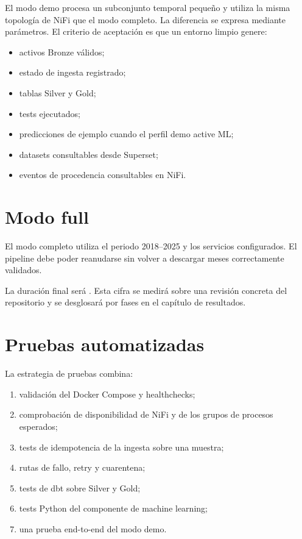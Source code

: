 El modo demo procesa un subconjunto temporal pequeño y utiliza la misma topología de NiFi que el modo completo. La diferencia se expresa mediante parámetros. El criterio de aceptación es que un entorno limpio genere:

\begin{itemize}
\item activos Bronze válidos;
\item estado de ingesta registrado;
\item tablas Silver y Gold;
\item tests ejecutados;
\item predicciones de ejemplo cuando el perfil demo active ML\@;
\item datasets consultables desde Superset;
\item eventos de procedencia consultables en NiFi.
\end{itemize}

\section{Modo full}

El modo completo utiliza el periodo 2018--2025 y los servicios configurados. El pipeline debe poder reanudarse sin volver a descargar meses correctamente validados.

La duración final será \PipelineDuration{}. Esta cifra se medirá sobre una revisión concreta del repositorio y se desglosará por fases en el capítulo de resultados.

\section{Pruebas automatizadas}

La estrategia de pruebas combina:

\begin{enumerate}
\item validación del Docker Compose y healthchecks;
\item comprobación de disponibilidad de NiFi y de los grupos de procesos esperados;
\item tests de idempotencia de la ingesta sobre una muestra;
\item rutas de fallo, retry y cuarentena;
\item tests de dbt sobre Silver y Gold;
\item tests Python del componente de machine learning;
\item una prueba end-to-end del modo demo.
\end{enumerate}

